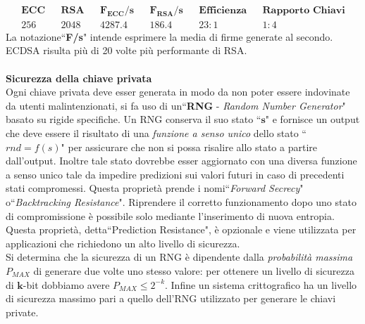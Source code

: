 \documentclass[a4paper,12pt]{tesiinfo}
\begin{document}
\begin{align*}
  &\textbf{ECC}& &\textbf{RSA}& &\textbf{$\mathbold{F_{ECC}}$/s}& &\textbf{$\mathbold{F_{RSA}}$/s}& &\textbf{Efficienza}& &\textbf{Rapporto Chiavi}&\\
  &256& &2048& &4287.4& &186.4& &23:1& &1:4&
\end{align*}
La notazione``\textbf{F/s}" intende esprimere la media di firme generate al secondo.\\
ECDSA risulta pi\`u di 20 volte pi\`u performante di RSA.
\\
\\
\textbf{Sicurezza della chiave privata}
\\
Ogni chiave privata deve esser generata in modo da non poter essere indovinate da utenti malintenzionati, si fa uso di un``\textbf{RNG} - \textit{Random Number Generator}" basato su rigide specifiche. Un RNG conserva il suo stato ``$\mathbold{s}$" e fornisce un output che deve essere il risultato di una \textit{funzione a senso unico} dello stato ``${rnd = f(s)}$" per assicurare che non si possa risalire allo stato a partire dall'output. Inoltre tale stato dovrebbe esser aggiornato con una diversa funzione a senso unico tale da impedire predizioni sui valori futuri in caso di precedenti stati compromessi. Questa propriet\`a prende i nomi``\textit{Forward Secrecy}" o``\textit{Backtracking Resistance}". Riprendere il corretto funzionamento dopo uno stato di compromissione \`e possibile solo mediante l'inserimento di nuova entropia. Questa propriet\`a, detta``Prediction Resistance", \`e opzionale e viene utilizzata per applicazioni che richiedono un alto livello di sicurezza.
\\
Si determina che la sicurezza di un RNG \`e dipendente dalla \textit{probabilit\`a massima} ${P_{MAX}}$ di generare due volte uno stesso valore: per ottenere un livello di sicurezza di $\mathbold{k}$-bit dobbiamo avere $P_{MAX} \leq 2^{-k}$.
Infine un sistema crittografico ha un livello di sicurezza massimo pari a quello dell'RNG utilizzato per generare le chiavi private.
\\
\end{document}
